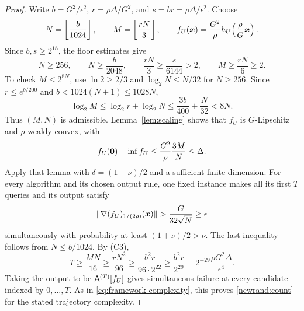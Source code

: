 \begin{proof}
Write $b=G^2/\epsilon^2$, $r=\rho\Delta/G^2$, and
$s=br=\rho\Delta/\epsilon^2$. Choose
\begin{equation}
 N=\left\lfloor\frac b{1024}\right\rfloor,
 \qquad M=\left\lfloor\frac{rN}{3}\right\rfloor,
 \qquad
 f_U(\bm{x})=\frac{G^2}{\rho}
 h_U\!\left(\frac\rho G\bm{x}\right).
 \label{newrand:scaling}
\end{equation}
Since $b,s\ge2^{18}$, the floor estimates give
\[
 N\ge256,\qquad N\ge\frac b{2048},\qquad
 \frac{rN}{3}\ge\frac s{6144}>2,\qquad
 M\ge\frac{rN}{6}\ge2.
\]
To check $M\le2^{8N}$, use $\ln2\ge2/3$ and
$\log_2N\le N/32$ for $N\ge256$.
Since $r\le e^{b/200}$ and $b<1024(N+1)\le1028N$,
\[
 \log_2M\le\log_2r+\log_2N
 \le\frac{3b}{400}+\frac N{32}<8N.
\]
Thus $(M,N)$ is admissible.
Lemma~\ref{lem:scaling} shows that $f_U$ is $G$-Lipschitz and
$\rho$-weakly convex, with
\[
 f_U({\mathbf 0})-\inf f_U
 \le\frac{G^2}{\rho}\frac{3M}{N}\le\Delta.
\]
Apply that lemma with $\delta=(1-\nu)/2$ and a sufficient finite
dimension. For every algorithm and its chosen output rule,
one fixed instance makes all its first $T$ queries and its output
satisfy
\[
 \|\nabla(f_U)_{1/(2\rho)}(\bm{x})\|
 >\frac G{32\sqrt N}\ge\epsilon
\]
simultaneously with probability at least $(1+\nu)/2>\nu$.
The last inequality follows from $N\le b/1024$.
By \textnormal{(C3)},
\[
 T\ge\frac{MN}{16}
 \ge\frac{rN^2}{96}
 \ge\frac{b^2r}{96\cdot2^{22}}\ge\frac{b^2r}{2^{29}}
 =2^{-29}\frac{\rho G^2\Delta}{\epsilon^4}.
\]
Taking the output to be ${\mathsf{A}}^{(T)}[f_U]$ gives simultaneous
failure at every candidate indexed by $0,\ldots,T$.
As in \eqref{eq:framework-complexity}, this proves
\eqref{newrand:count} for the stated trajectory complexity.
\end{proof}

